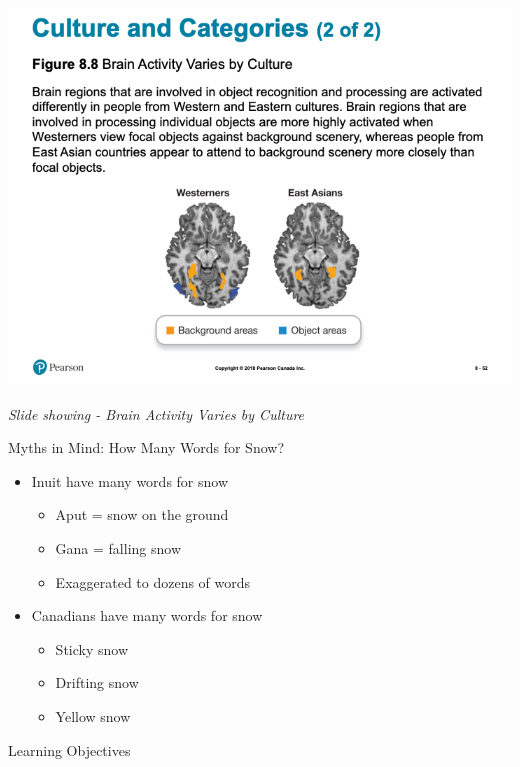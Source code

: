 \documentclass[
]{book}
\providecommand{\tightlist}{%
  \setlength{\itemsep}{0pt}\setlength{\parskip}{0pt}}
\begin{document}
\begin{reflect}
\includegraphics{assets/unit_1/slide_52.png}

\emph{Slide showing - Brain Activity Varies by Culture}

Myths in Mind: How Many Words for Snow?

\begin{itemize}
\tightlist
\item
  Inuit have many words for snow

  \begin{itemize}
  \tightlist
  \item
    Aput = snow on the ground\\
  \item
    Gana = falling snow\\
  \item
    Exaggerated to dozens of words\\
  \end{itemize}
\item
  Canadians have many words for snow

  \begin{itemize}
  \tightlist
  \item
    Sticky snow\\
  \item
    Drifting snow\\
  \item
    Yellow snow
  \end{itemize}
\end{itemize}

Learning Objectives


\end{reflect}
\end{document}
